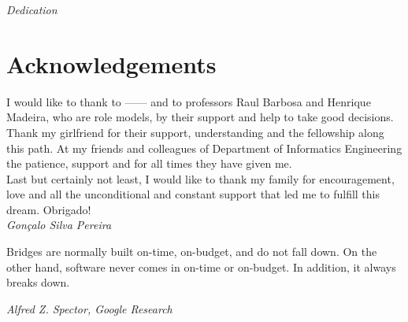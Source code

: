 
\pagestyle{empty}
\begin{center}

\emph{Dedication}
	
\end{center}



\newpage
\pagestyle{fancy}
\section*{Acknowledgements}

I would like to thank to ------ and to professors Raul Barbosa and Henrique Madeira, who are role models, by their support and help to take good decisions.\\

Thank my girlfriend for their support, understanding and the fellowship along this path. At my friends and colleagues of Department of Informatics Engineering the patience, support and for all times they have given me. \\

Last but certainly not least, I would like to thank my family for encouragement, love and all the unconditional and constant support that led me to fulfill this dream. Obrigado!\\



\emph{\hfill Gonçalo Silva Pereira}

\newpage

\vspace*{\fill}
\pagestyle{empty}

\begin{shadequote}
Bridges are normally built on-time, on-budget, and do not
fall down. On the other hand, software never comes in on-time
or on-budget. In addition, it always breaks down.\par\emph{Alfred Z. Spector, Google Research}
\end{shadequote}

